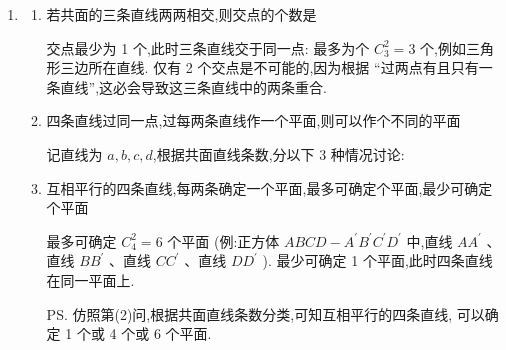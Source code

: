 \begin{enumerate}
    \item \begin{enumerate}
        \item 若共面的三条直线两两相交,则交点的个数是
        \begin{jieda}
            交点最少为 1 个,此时三条直线交于同一点: 最多为个 ${C}_{3}^{2} = 3$ 个,例如三角形三边所在直线. 仅有 2 个交点是不可能的,因为根据 “过两点有且只有一条直线”,这必会导致这三条直线中的两条重合.
        \end{jieda}
        \item 四条直线过同一点,过每两条直线作一个平面,则可以作个不同的平面
        \begin{jieda}
            记直线为 $a,b,c,d$,根据共面直线条数,分以下 3 种情况讨论: 
        \end{jieda}
        \item 互相平行的四条直线,每两条确定一个平面,最多可确定个平面,最少可确定个平面
        \begin{jieda}
            最多可确定 ${C}_{4}^{2} = 6$ 个平面 (例:正方体 ${ABCD} - {A}^{\prime }{B}^{\prime }{C}^{\prime }{D}^{\prime }$ 中,直线 $A{A}^{\prime }$ 、直线 $B{B}^{\prime }$ 、直线 $C{C}^{\prime }$ 、直线 $D{D}^{\prime }$ ). 最少可确定 1 个平面,此时四条直线在同一平面上. 
            
            \ps 仿照第(2)问,根据共面直线条数分类,可知互相平行的四条直线, 可以确定 1 个或 4 个或 6 个平面.
        \end{jieda}
    \end{enumerate}
\end{enumerate}
